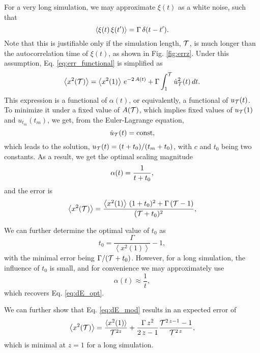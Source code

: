 \documentclass[reprint]{revtex4-1}
\begin{document}
For a very long simulation,
we may approximate $\xi(t)$ as a white noise,
such that
\begin{equation}
  \left\langle \xi(t) \, \xi(t') \right\rangle
  = \Gamma \, \delta(t - t').
  \notag
\end{equation}
%
Note that this is justifiable only
if the simulation length, $\mathcal T$, is much longer than
the autocorrelation time of $\xi(t)$,
as shown in Fig. \ref{fig:errz}.
%
Under this assumption,
Eq. \eqref{eq:err_functional} is simplified as
%
\begin{equation}
  \left\langle
    x^2(\mathcal T)
  \right\rangle
  =
  \left\langle
    x^2(1)
  \right\rangle
  \, e^{ -2 \, A(t) }
  +
  \Gamma
  \int_1^{\mathcal T}
    \dot u_{\mathcal T}^2(t) \, dt
  .
  \label{eq:err_functional_wn}
\end{equation}
%
This expression is a functional of $\alpha(t)$,
or equivalently, a functional of $u_{\mathcal T}(t)$.
%
To minimize it under a fixed value of $A(\mathcal T)$,
which implies fixed values of $u_{\mathcal T}(1)$ and $u_{t_m}(t_m)$,
we get, from the Euler-Lagrange equation,
$$
\dot u_{\mathcal T}(t) = \mathrm{const},
$$
which leads to the solution,
$u_{\mathcal T}(t) = (t + t_0) / (t_m + t_0)$,
with $c$ and $t_0$ being two constants.
%
As a result, we get the optimal scaling magnitude
%
\begin{equation}
  \alpha(t) = \frac{ 1 } { t + t_0 }
  ,
  \notag
\end{equation}
%
and the error is
%
$$%
  \left\langle
    x^2(\tmax)
  \right\rangle
  =
  \frac{
    \left\langle x^2(1) \right\rangle
    \, (1 + t_0)^2
    + \Gamma \, (\tmax - 1)
  }
  {
    (\tmax + t_0)^2
  }
  ,
$$%

We can further determine the optimal value of $t_0$ as
$$
t_0 = \frac{ \Gamma } { \left\langle x^2(1) \right\rangle } - 1,
$$
%
with the minimal error being $\Gamma / (\mathcal T + t_0)$.
%
However, for a long simulation, the influence of $t_0$
is small, and for convenience we may approximately use
$$
\alpha(t) \approx \frac 1 t,
$$
which recovers Eq. \eqref{eq:dE_opt}.

We can further show that Eq. \eqref{eq:dE_mod}
results in an expected error of
\begin{equation}
  \left\langle
  x^2(\mathcal T)
  \right\rangle
  =
  \frac{ \langle x^2(1) \rangle } { \mathcal T^{2z} }
  +
  \frac{ \Gamma \, z^2 } { 2 \, z - 1 }
  \frac{
    \mathcal T^{2 \, z - 1} - 1
  }
  {
    \mathcal T^{2 \, z}
  }
  ,
  \notag
\end{equation}
which is minimal at $z = 1$ for a long simulation.
\end{document}
